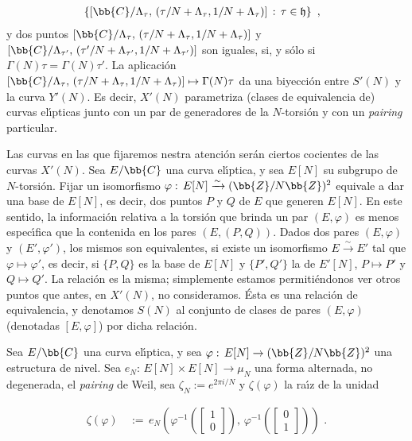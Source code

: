 \begin{align*}
& \left\lbrace [\bb{C}/\Lambda_{\tau},\,
(\tau/N+\Lambda_{\tau},1/N+\Lambda_{\tau})]\,:\,\tau\in\frak{h} \right\rbrace
\text{ ,}
\end{align*}
y dos puntos $[\bb{C}/\Lambda_{\tau},\,
(\tau/N+\Lambda_{\tau},1/N+\Lambda_{\tau})]$ y $[\bb{C}/\Lambda_{\tau'},\,
(\tau'/N+\Lambda_{\tau'},1/N+\Lambda_{\tau'})]$ son iguales, si, y s\'{o}lo si
$\Gamma(N)\tau=\Gamma(N)\tau'$. La aplicaci\'{o}n $[\bb{C}/\Lambda_{\tau},\,
(\tau/N+\Lambda_{\tau},1/N+\Lambda_{\tau})]\mapsto\Gamma(N)\tau$ da una
biyecci\'{o}n entre $S'(N)$ y la curva $Y'(N)$. Es decir, $X'(N)$ parametriza
(clases de equivalencia de) curvas el\'{\i}pticas junto con un par de generadores
de la $N$-torsi\'{o}n y con un \textit{pairing} particular.

Las curvas en las que fijaremos nestra atenci\'{o}n ser\'{a}n ciertos cocientes
de las curvas $X'(N)$. Sea $E/\bb{C}$ una curva el\'{\i}ptica, y sea $E[N]$ su
subgrupo de $N$-torsi\'{o}n. Fijar un isomorfismo
$\varphi:\,E[N]\xrightarrow{\sim}(\bb{Z}/N\bb{Z})^{2}$ equivale a dar una base de
$E[N]$, es decir, dos puntos $P$ y $Q$ de $E$ que generen $E[N]$. En este sentido,
la informaci\'{o}n relativa a la torsi\'{o}n que brinda un par $(E,\varphi)$ es
menos espec\'{\i}fica que la contenida en los pares $(E,(P,Q))$. Dados dos pares
$(E,\varphi)$ y $(E',\varphi')$, los mismos son equivalentes, si existe un
isomorfismo $E\xrightarrow{\sim}E'$ tal que $\varphi\mapsto\varphi'$, es decir,
si $\{P,Q\}$ es la base de $E[N]$ y $\{P',Q'\}$ la de $E'[N]$, $P\mapsto P'$ y
$Q\mapsto Q'$. La relaci\'{o}n es la misma; simplemente estamos permiti\'{e}ndonos
ver otros puntos que antes, en $X'(N)$, no consideramos. \'{E}sta es una
relaci\'{o}n de equivalencia, y denotamos $S(N)$ al conjunto de clases de pares
$(E,\varphi)$ (denotadas $[E,\varphi]$) por dicha relaci\'{o}n.

Sea $E/\bb{C}$ una curva el\'{\i}ptica, y sea
$\varphi:\,E[N]\rightarrow(\bb{Z}/N\bb{Z})^{2}$ una estructura de nivel. Sea
$e_{N}:\,E[N]\times E[N]\rightarrow\mu_{N}$ una forma alternada, no degenerada,
el \textit{pairing} de Weil, sea $\zeta_{N}:=e^{2\pi i/N}$ y $\zeta(\varphi)$ la
ra\'{\i}z de la unidad

\begin{align*}
\zeta(\varphi) & \,:=\,e_{N}\left(
\varphi^{-1}\left(\begin{bmatrix}1\\0\end{bmatrix}\right),\,
\varphi^{-1}\left(\begin{bmatrix}0\\1\end{bmatrix}\right)\right)
\text{ .}
\end{align*}

